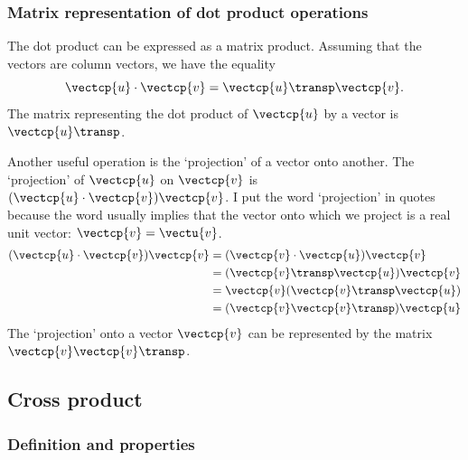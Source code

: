 \subsubsection{Matrix representation of dot product operations}
The dot product can be expressed as a matrix product.
Assuming that the vectors are column vectors, we have the equality
\begin{equation}
    \vectcp{u} \cdot \vectcp{v}
    =
    \vectcp{u}\transp \vectcp{v}
    \text{.}
\end{equation}
The matrix representing the dot product of $\vectcp{u}$ by a vector is $\vectcp{u}\transp$.

Another useful operation is the `projection' of a vector onto another.
The `projection' of $\vectcp{u}$ on $\vectcp{v}$
is $(\vectcp{u} \cdot \vectcp{v})\vectcp{v}$.
I put the word `projection' in quotes because the word usually implies that the vector onto which we project is a real unit vector: $\vectcp{v}=\vectu{v}$.
\begin{subequations}  
    \label{eq:projection_matrix}
    \begin{align}
        (\vectcp{u} \cdot \vectcp{v})\vectcp{v}
        &=
        (\vectcp{v} \cdot \vectcp{u})\vectcp{v}
        \\
        &=
        (\vectcp{v}\transp \vectcp{u})\vectcp{v}
        \\
        &=
        \vectcp{v}(\vectcp{v}\transp \vectcp{u})
        \\
        &=
        (\vectcp{v} \vectcp{v}\transp) \vectcp{u}
    \end{align}
\end{subequations}
The `projection' onto a vector $\vectcp{v}$ can be represented by the matrix $\vectcp{v} \vectcp{v}\transp$.






\subsection{Cross product}

\subsubsection{Definition and properties}

